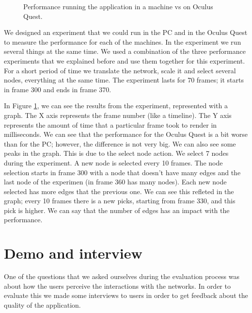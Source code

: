 \begin{figure}[h!]
  \centering
  \begin{minipage}{.8\textwidth}
  \end{minipage}
\caption{Performance running the application in a machine vs on Oculus Quest.}
\label{fig:pc_vs_oculus}
\end{figure}

We designed an experiment that we could run in the PC and in the Oculus Quest to measure the performance for each of the machines. In the experiment we run several things at the same time. We used a combination of the three performance experiments that we explained before and use them together for this experiment. For a short period of time we translate the network, scale it and select several nodes, everything at the same time. The experiment lasts for 70 frames; it starts in frame 300 and ends in frame 370.

In Figure \ref{fig:pc_vs_oculus}, we can see the results from the experiment, represented with a graph. The X axis represents the frame number (like a timeline). The Y axis represents the amount of time that a particular frame took to render in milliseconds. We can see that the performance for the Oculus Quest is a bit worse than for the PC; however, the difference is not very big. We can also see some peaks in the graph. This is due to the select node action. We select 7 nodes during the experiment. A new node is selected every 10 frames. The node selection starts in frame 300 with a node that doesn't have many edges and the last node of the experimen (in frame 360 has many nodes). Each new node selected has more edges that the previous one. We can see this refleted in the graph; every 10 frames there is a new picks, starting from frame 330, and this pick is higher. We can say that the number of edges has an impact with the performance.

\section{Demo and interview}
One of the questions that we asked ourselves during the evaluation process was about how the users perceive the interactions with the networks. In order to evaluate this we made some interviews to users in order to get feedback about the quality of the application.

